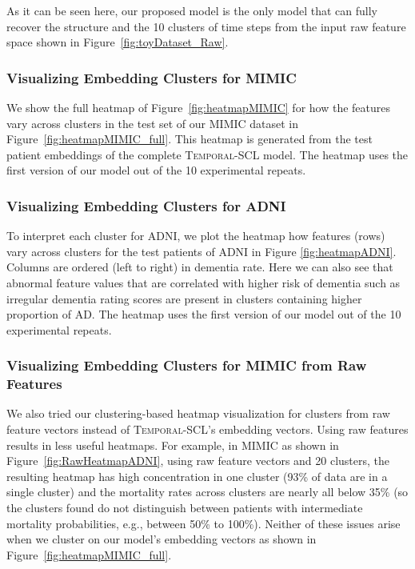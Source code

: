 \documentclass[pmlr,twocolumn,10pt]{jmlr} %
\begin{document}
As it can be seen here, our proposed model is the only model that can fully recover the structure and the 10 clusters of time steps from the input raw feature space shown in Figure~\ref{fig:toyDataset_Raw}.

\subsubsection{Visualizing Embedding Clusters for MIMIC}
\label{sec:heatmap_mimic}
We show the full heatmap of Figure~\ref{fig:heatmapMIMIC} for how the features vary across clusters in the test set of our MIMIC dataset in Figure~\ref{fig:heatmapMIMIC_full}. This heatmap is generated from the test patient embeddings of the complete \textsc{Temporal-SCL} model.
The heatmap uses the first version of our model out of the 10 experimental repeats.



\subsubsection{Visualizing Embedding Clusters for ADNI}
\label{sec:heatmap_adni}

To interpret each cluster for ADNI, we plot the heatmap how features (rows) vary across clusters for the test patients of ADNI in Figure \ref{fig:heatmapADNI}.
Columns are ordered (left to right) in dementia rate. 
Here we can also see that abnormal feature values that are correlated with higher risk of dementia such as irregular dementia rating scores are present in clusters containing higher proportion of AD. The heatmap uses the first version of our model out of the 10 experimental repeats.




\subsubsection{Visualizing Embedding Clusters for MIMIC from Raw Features}
\label{sec:heatmap_mimic_raw}
We also tried our clustering-based heatmap visualization for clusters from raw feature vectors instead of \textsc{Temporal-SCL}’s embedding vectors. Using raw features results in less useful heatmaps. For example, in MIMIC as shown in Figure~\ref{fig:RawHeatmapADNI}, using raw feature vectors and 20 clusters, the resulting heatmap has high concentration in one cluster (93\% of data are in a single cluster) and the mortality rates across clusters are nearly all below 35\% (so the clusters found do not distinguish between patients with intermediate mortality probabilities, e.g., between 50\% to 100\%). Neither of these issues arise when we cluster on our model’s embedding vectors as shown in Figure~\ref{fig:heatmapMIMIC_full}.
\end{document}
